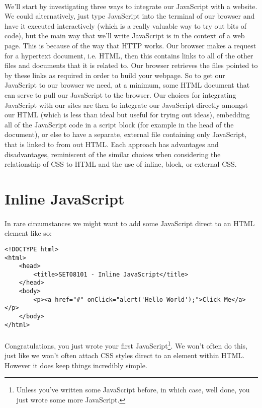 \documentclass[10pt, a4paper, twosize]{article}
\begin{document}
\paragraph{} We'll start by investigating three ways to integrate our JavaScript with a website. We could alternatively, just type JavaScript into the terminal of our browser and have it executed interactively (which is a really valuable way to try out bits of code), but the main way that we'll write JavaScript is in the context of a web page. This is because of the way that HTTP works. Our browser makes a request for a hypertext document, i.e. HTML, then this contains links to all of the other files and documents that it is related to. Our browser retrieves the files pointed to by these links as required in order to build your webpage. So to get our JavaScript to our browser we need, at a minimum, some HTML document that can serve to pull our JavaScript to the browser. Our choices for integrating JavaScript with our sites are then to integrate our JavaScript directly amongst our HTML (which is less than ideal but useful for trying out ideas), embedding all of the JavaScript code in a script block (for example in the head of the document), or else to have a separate, external file containing only JavaScript, that is linked to from out HTML. Each approach has advantages and disadvantages, reminiscent of the similar choices when considering the relationship of CSS to HTML and the use of inline, block, or external CSS.

\section{Inline JavaScript}

\paragraph{} In rare circumstances we might want to add some JavaScript direct to an HTML element like so:

\begin{lstlisting}
<!DOCTYPE html>
<html>
    <head>
        <title>SET08101 - Inline JavaScript</title>
    </head>
    <body>
        <p><a href="#" onClick="alert('Hello World');">Click Me</a></p> 
    </body>
</html>
\end{lstlisting}

\paragraph{} Congratulations, you just wrote your first JavaScript\footnote{Unless you've written some JavaScript before, in which case, well done, you just wrote some more JavaScript.}. We won't often do this, just like we won't often attach CSS styles direct to an element within HTML. However it does keep things incredibly simple.
\end{document}
